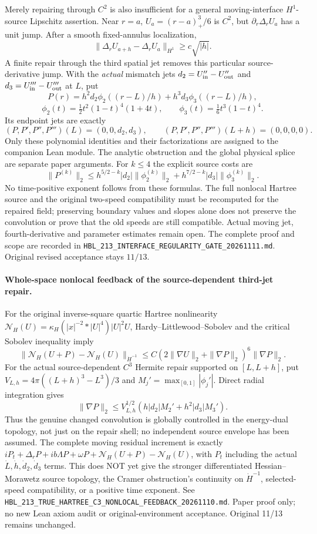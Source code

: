 \documentclass[11pt]{amsart}
\begin{document}
Merely repairing through $C^2$ is also insufficient for a general
moving-interface $H^1$-source Lipschitz assertion. Near $r=a$,
$U_a=(r-a)_+^3/6$ is $C^2$, but
$\partial_r\Delta_rU_a$ has a unit jump. After a smooth fixed-annulus
localization,
\[
 \|\Delta_r U_{a+h}-\Delta_r U_a\|_{H^1}\ge c\sqrt{|h|}.
\]
A finite repair through the third spatial jet removes this
particular source-derivative jump. With the \emph{actual} mismatch
jets $d_2=U_{\rm in}''-U_{\rm out}''$ and
$d_3=U_{\rm in}'''-U_{\rm out}'''$ at $L$, put
\[
 P(r)=h^2d_2\phi_2((r-L)/h)+h^3d_3\phi_3((r-L)/h),
\]
\[
 \phi_2(t)=\tfrac12t^2(1-t)^4(1+4t),\qquad
 \phi_3(t)=\tfrac16t^3(1-t)^4.
\]
Its endpoint jets are exactly
\[
 (P,P',P'',P''')(L)=(0,0,d_2,d_3),\qquad
 (P,P',P'',P''')(L+h)=(0,0,0,0).
\]
Only these polynomial identities and their factorizations are
assigned to the companion Lean module. The analytic obstruction
and the global physical splice are separate paper arguments.
For $k\le4$ the explicit source costs are
\[
 \|P^{(k)}\|_2\le
 h^{5/2-k}|d_2|\|\phi_2^{(k)}\|_2+
 h^{7/2-k}|d_3|\|\phi_3^{(k)}\|_2.
\]
No time-positive exponent follows from these formulas.
The full nonlocal Hartree source and the original two-speed
compatibility must be recomputed for the repaired field; preserving
boundary values and slopes alone does not preserve the convolution
or prove that the old speeds are still compatible. Actual moving
jet, fourth-derivative and parameter estimates remain open.
The complete proof and scope are recorded in
\texttt{HBL\_213\_INTERFACE\_REGULARITY\_GATE\_20261111.md}.
Original revised acceptance stays $11/13$.



\paragraph{Whole-space nonlocal feedback of the source-dependent third-jet repair.}
For the original inverse-square quartic Hartree nonlinearity
$\mathcal N_H(U)=\kappa_H(|x|^{-2}*|U|^4)|U|^2U$,
Hardy--Littlewood--Sobolev and the critical Sobolev inequality imply
\[
\|\mathcal N_H(U+P)-\mathcal N_H(U)\|_{\dot H^{-1}}
\le C(2\|\nabla U\|_2+\|\nabla P\|_2)^6\|\nabla P\|_2.
\]
For the actual source-dependent $C^3$ Hermite repair supported on
$[L,L+h]$, put
$V_{L,h}=4\pi((L+h)^3-L^3)/3$ and
$M_j'=\max_{[0,1]}|\phi_j'|$. Direct radial integration gives
\[
\|\nabla P\|_2\le V_{L,h}^{1/2}
(h|d_2|M_2'+h^2|d_3|M_3').
\]
Thus the genuine changed convolution is globally controlled in the
energy-dual topology, not just on the repair shell; no independent
source envelope has been assumed. The complete moving residual increment
is exactly $iP_t+\Delta_rP+ib\Lambda P+\omega P+
\mathcal N_H(U+P)-\mathcal N_H(U)$, with $P_t$ including the actual
$\dot L,\dot h,\dot d_2,\dot d_3$ terms. This does NOT yet give the
stronger differentiated Hessian--Morawetz source topology, the Cramer
obstruction's continuity on $\dot H^{-1}$, selected-speed compatibility,
or a positive time exponent. See
\texttt{HBL\_213\_TRUE\_HARTREE\_C3\_NONLOCAL\_FEEDBACK\_20261110.md}.
Paper proof only; no new Lean axiom audit or original-environment
acceptance. Original 11/13 remains unchanged.
\end{document}
